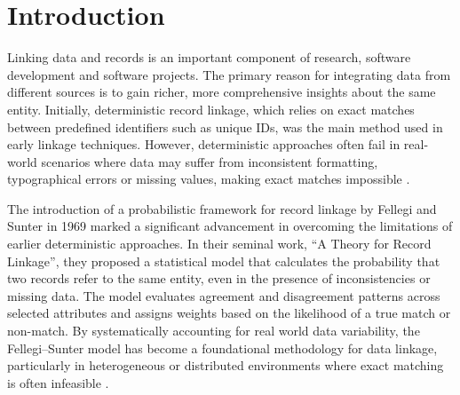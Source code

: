 \chapter{Introduction}  \label{sec:introduction}

%


Linking data and records is an important component of research, software development and software projects.
The primary reason for integrating data from different sources is to gain richer, more comprehensive insights about the same entity.
Initially, deterministic record linkage, which relies on exact matches between predefined identifiers such as unique IDs, was the main method used in early linkage techniques.
However, deterministic approaches often fail in real-world scenarios where data may suffer from inconsistent formatting, typographical errors or missing values, making exact matches impossible \cite{herzog2007data}.

The introduction of a probabilistic framework for record linkage by Fellegi and Sunter in 1969 \cite{fellegi1969theory} marked a significant advancement in overcoming the limitations of earlier deterministic approaches.
In their seminal work, \enquote{A Theory for Record Linkage}, they proposed a statistical model that calculates the probability that two records refer to the same entity, even in the presence of inconsistencies or missing data.
The model evaluates agreement and disagreement patterns across selected attributes and assigns weights based on the likelihood of a true match or non-match.
By systematically accounting for real world data variability, the Fellegi–Sunter model has become a foundational methodology for data linkage, particularly in heterogeneous or distributed environments where exact matching is often infeasible \cite{fellegi1969theory}.


